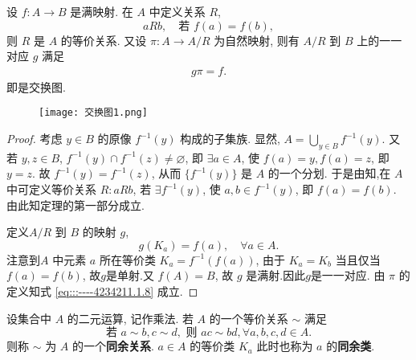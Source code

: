 \documentclass[../../main.tex]{subfiles}
\begin{document}
\begin{theorem}\label{theorem:一个满射可定义一个等价关系}
设 \( f:A \to B \) 是满映射. 在 \( A \) 中定义关系 \( R \),
\[
aRb,\quad \text{若 } f(a) = f(b),
\]
则 \( R \) 是 \( A \) 的等价关系. 又设 \( \pi:A \to A/R \) 为自然映射, 则有 \( A/R \) 到 \( B \) 上的一一对应 \( g \) 满足
\begin{align}
g\pi = f. \label{eq:::----4234211.1.8}
\end{align}
即是交换图.
\end{theorem}
\begin{figure}[H]
\centering
\texttt{[image: 交换图1.png]}
\caption{}
\label{figure:交换图1}
\end{figure}
\begin{proof}
考虑 \( y \in B \) 的原像 \( f^{-1}(y) \) 构成的子集族. 显然, \( A = \bigcup_{y \in B} f^{-1}(y) \). 又若 \( y,z \in B \), \( f^{-1}(y) \cap f^{-1}(z) \neq \varnothing \), 即 \( \exists a \in A \), 使 \( f(a) = y, f(a) = z \), 即 \( y = z \). 故 \( f^{-1}(y) = f^{-1}(z) \), 从而 \( \{ f^{-1}(y) \} \) 是 \( A \) 的一个分划. 于是由知,在 \( A \) 中可定义等价关系 \( R: aRb \), 若 \( \exists f^{-1}(y) \), 使 \( a,b \in f^{-1}(y) \), 即 \( f(a) = f(b) \). 由此知定理的第一部分成立.

定义\( A/R \) 到 \( B \) 的映射 \( g \),
\[
g(K_a) = f(a),\quad \forall a \in A.
\]
注意到\( A \) 中元素 \( a \) 所在等价类 \( K_a = f^{-1}(f(a)) \), 由于 \( K_a = K_b \) 当且仅当 \( f(a) = f(b) \), 故$g$是单射.又 \( f(A) = B \), 故 \( g \) 是满射.因此$g$是一一对应. 由 \( \pi \) 的定义知式 \eqref{eq:::----4234211.1.8} 成立.

\end{proof}

\begin{definition}[同余关系和同余类]
设集合中 \( A \) 的二元运算, 记作乘法. 若 \( A \) 的一个等价关系 \( \sim \) 满足
\[
\text{若 } a \sim b, c \sim d, \text{ 则 } ac \sim bd, \forall a,b,c,d \in A .
\]
则称 \( \sim \) 为 \( A \) 的一个\textbf{同余关系}. \( a \in A \) 的等价类 \( K_a \) 此时也称为 \( a \) 的\textbf{同余类}.
\end{definition}
\end{document}
